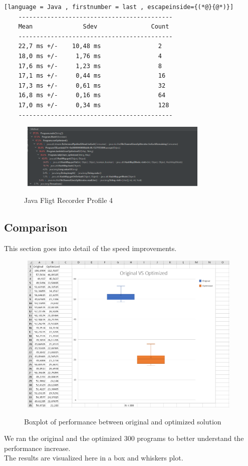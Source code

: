 \begin{lstlisting}[language = Java , firstnumber = last , escapeinside={(*@}{@*)}]
    -------------------------------------------
    Mean              Sdev               Count
    -------------------------------------------
    22,7 ms +/-    10,48 ms                2
    18,0 ms +/-     1,76 ms                4
    17,6 ms +/-     1,23 ms                8
    17,1 ms +/-     0,44 ms                16
    17,3 ms +/-     0,61 ms                32
    16,8 ms +/-     0,16 ms                64
    17,0 ms +/-     0,34 ms                128
    -------------------------------------------
\end{lstlisting}

\begin{figure}[H]
    \centering\
    \includegraphics[width = 0.8\textwidth ]{figures/profile4.PNG}
    \caption{Java Fligt Recorder Profile 4}
    \label{fig:p4}
\end{figure}

\subsection{Comparison}
This section goes into detail of the speed improvements.

\begin{figure}[H]
    \centering\
    \includegraphics[width = 0.95\textwidth ]{figures/boxplots.png}
    \caption{Boxplot of performance between original and optimized solution}
    \label{fig:boxplots}
\end{figure}

We ran the original and the optimized 300 programs to better understand the performance increase.\\
The results are visualized here in a box and whiskers plot.

\newpage
\vspace{0.5cm}

